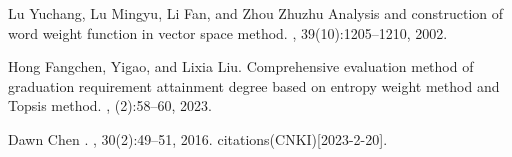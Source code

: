 \documentclass[12pt]{article}  %
\begin{document}
\begin{thebibliography}{99}
Lu Yuchang, Lu Mingyu, Li Fan, and Zhou Zhuzhu
\newblock Analysis and construction of word weight function in vector space method.
, 39(10):1205--1210, 2002.

Hong Fangchen, Yigao, and Lixia Liu.
\newblock
  {Comprehensive evaluation method of graduation requirement attainment degree based on entropy weight method and Topsis method}.
, (2):58--60, 2023.

Dawn Chen
.
, 30(2):49--51, 2016.
 citations(CNKI)[2023-2-20].

\end{thebibliography}






\end{document}

